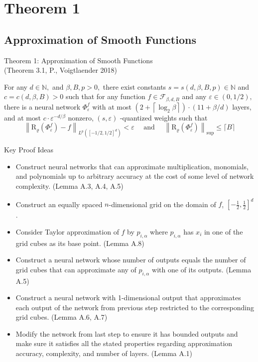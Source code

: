 \documentclass{if-beamer}
\begin{document}
\section{Theorem 1}
\subsection{Approximation of Smooth Functions}
\begin{frame}{Theorem 1: Approximation of Smooth Functions \\(Theorem 3.1, P., Voigtlaender 2018)}
    \begin{tcolorbox}
        For any $d \in \mathbb{N},$ and $\beta, B, p>0,$ there exist constants $s=s(d, \beta, B, p) \in \mathbb{N}$ and $c=c(d, \beta, B)>0$ such that for any function $f \in \mathcal{F}_{\beta, d, B}$ and any $\varepsilon \in(0,1 / 2),$ there is a neural network $\Phi_{\varepsilon}^{f}$ with at most $\left(2+\left\lceil\log _{2} \beta\right\rceil\right) \cdot(11+\beta / d)$ layers, and at most $c \cdot \varepsilon^{-d / \beta}$ nonzero, $(s, \varepsilon)$ -quantized weights such that {\small
        \[
        \left\|\mathrm{R}_{\varrho}\left(\Phi_{\varepsilon}^{f}\right)-f\right\|_{L^{p}\left([-1 / 2,1 / 2]^{d}\right)}<\varepsilon \quad \text { and } \quad\left\|\mathrm{R}_{\varrho}\left(\Phi_{\varepsilon}^{f}\right)\right\|_{\mathrm{sup}} \leq\lceil B\rceil
        \]
        }
    \end{tcolorbox}
\end{frame}

\begin{frame}{Key Proof Ideas}
    \begin{itemize}
        \item Construct neural networks that can approximate multiplication, monomials, and polynomials up to arbitrary accuracy at the cost of some level of network complexity. (Lemma A.3, A.4, A.5)
        \item Construct an equally spaced $n$-dimensional grid on the domain of $f$, $[-\frac{1}{2}, \frac{1}{2}]^d$.
        \item Consider Taylor approximation of $f$ by $p_{i,\alpha}$ where $p_{i,\alpha}$ has $x_i$ in one of the grid cubes as its base point. (Lemma A.8)
        \item Construct a neural network whose number of outputs equals the number of grid cubes that can approximate any of $p_{i,\alpha}$ with one of its outputs. (Lemma A.5)
        \item Construct a neural network with 1-dimensional output that approximates each output of the network from previous step restricted to the corresponding grid cubes. (Lemma A.6, A.7)
        \item Modify the network from last step to ensure it has bounded outputs and make sure it satisfies all the stated properties regarding approximation accuracy, complexity, and number of layers. (Lemma A.1)
    \end{itemize}
\end{frame}
\end{document}
